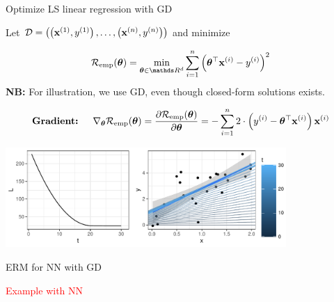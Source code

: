 \documentclass[11pt,compress,t,notes=noshow, xcolor=table]{beamer}
\begin{document}


\begin{vbframe}{Optimize LS linear regression with GD}

	\begin{footnotesize}

	Let $\mathcal{D} = \left( \left(\mathbf{x}^{(1)}, y^{(1)}\right), \ldots, \left(\mathbf{x}^{(n)}, y^{(n)}\right)\right)$ and minimize 

	$$
		\risket = \min_{\thetab\in \R^d} \sumin \left(\thetab^\top \xi - \yi\right)^2
	$$
	\textbf{NB: } For illustration, we use GD, even though closed-form solutions exists. 
	\end{footnotesize}
	
	\begin{footnotesize}
	\begin{eqnarray*}
	\textbf{Gradient: } && \nabla_{\bm{\theta}}\mathcal{R}_{\text{emp}}(\bm{\theta}) =  \frac{\partial \mathcal{R}_{\text{emp}}(\bm{\theta})}{\partial
	\bm{\theta}} = - \sum_{i=1}^n 2 \cdot \left(y^{(i)} - \bm{\theta}^{\top} \mathbf{x}^{(i)}\right) \mathbf{x}^{(i)} \\
	\end{eqnarray*}
	\end{footnotesize}


	\vspace*{-0.5cm}

	\begin{center}
	\includegraphics[width=0.8\textwidth]{figure_man/gradient_descent_lm.pdf}
	\end{center}

\end{vbframe}

\begin{vbframe}{ERM for NN with GD}

	\textcolor{red}{Example with NN}

\end{vbframe}
\end{document}
